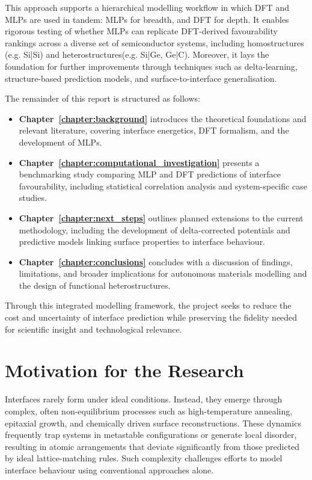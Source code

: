 This approach supports a hierarchical modelling workflow in which DFT and MLPs are used in tandem: MLPs for breadth, and DFT for depth. It enables rigorous testing of whether MLPs can replicate DFT-derived favourability rankings across a diverse set of semiconductor systems, including homostructures (e.g. Si|Si) and heterostructures(e.g. Si|Ge, Ge|C). Moreover, it lays the foundation for further improvements through techniques such as delta-learning, structure-based prediction models, and surface-to-interface generalisation. 

The remainder of this report is structured as follows: 

\begin{itemize}
    \item \textbf{Chapter~\ref{chapter:background}} introduces the theoretical foundations and relevant literature, covering interface energetics, DFT formalism, and the development of MLPs.
    \item \textbf{Chapter~\ref{chapter:computational_investigation}} presents a benchmarking study comparing MLP and DFT predictions of interface favourability, including statistical correlation analysis and system-specific case studies.
    \item \textbf{Chapter~\ref{chapter:next_steps}} outlines planned extensions to the current methodology, including the development of delta-corrected potentials and predictive models linking surface properties to interface behaviour.
    \item \textbf{Chapter~\ref{chapter:conclusions}} concludes with a discussion of findings, limitations, and broader implications for autonomous materials modelling and the design of functional heterostructures.
\end{itemize}

Through this integrated modelling framework, the project seeks to reduce the cost and uncertainty of interface prediction while preserving the fidelity needed for scientific insight and technological relevance. 

\section{Motivation for the Research} \label{section:motivation} 

Interfaces rarely form under ideal conditions. Instead, they emerge through complex, often non-equilibrium processes such as high-temperature annealing, epitaxial growth, and chemically driven surface reconstructions. These dynamics frequently trap systems in metastable configurations or generate local disorder, resulting in atomic arrangements that deviate significantly from those predicted by ideal lattice-matching rules. Such complexity challenges efforts to model interface behaviour using conventional approaches alone. 

